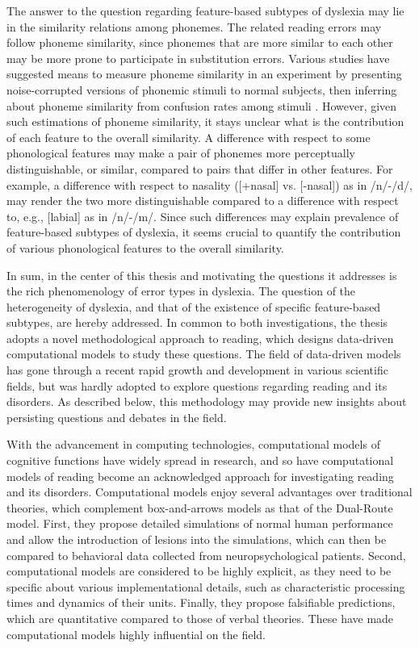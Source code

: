 The answer to the question regarding feature-based subtypes of dyslexia may lie in the similarity relations among phonemes. The related reading errors may follow phoneme similarity, since phonemes that are more similar to each other may be more prone to participate in substitution errors. Various studies have suggested means to measure phoneme similarity in an experiment \citep{NicelyMiller1955, Luce1987, cutler2004patterns} by presenting noise-corrupted versions of phonemic stimuli to normal subjects, then inferring about phoneme similarity from confusion rates among stimuli \citep{Tversky1977}. However, given such estimations of phoneme similarity, it stays unclear what is the contribution of each feature to the overall similarity. A difference with respect to some phonological features may make a pair of phonemes more perceptually distinguishable, or similar, compared to pairs that differ in other features. For example, a difference with respect to nasality ([+nasal] vs. [-nasal]) as in /n/-/d/, may render the two more distinguishable compared to a difference with respect to, e.g., [labial] as in /n/-/m/. Since such differences may explain prevalence of feature-based subtypes of dyslexia, it seems crucial to quantify the contribution of various phonological features to the overall similarity.

In sum, in the center of this thesis and motivating the questions it addresses is the rich phenomenology of error types in dyslexia. The question of the heterogeneity of dyslexia, and that of the existence of specific feature-based subtypes, are hereby addressed. In common to both investigations, the thesis adopts a novel methodological approach to reading, which designs data-driven computational models to study these questions. The field of data-driven models has gone through a recent rapid growth and development in various scientific fields, but was hardly adopted to explore questions regarding reading and its disorders. As described below, this methodology may provide new insights about persisting questions and debates in the field.

With the advancement in computing technologies, computational models of cognitive functions have widely spread in research, and so have computational models of reading become an acknowledged approach for investigating  reading and its disorders. Computational models enjoy several advantages over traditional theories, which complement box-and-arrows models as that of the Dual-Route model. First, they propose detailed simulations of normal human performance and allow the introduction of lesions into the simulations, which can then be compared to behavioral data collected from neuropsychological patients. Second, computational models are considered to be highly explicit, as they need to be specific about various implementational details, such as characteristic processing times and dynamics of their units. Finally, they propose falsifiable predictions, which are quantitative compared to those of verbal theories. These have made computational models highly influential on the field.

